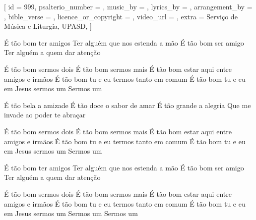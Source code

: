 [
    id                     = {999},
    psalterio_number       = {},
    music_by               = {},
    lyrics_by              = {},
    arrangement_by         = {},
    bible_verse            = {},
    licence_or_copyright   = {},
    video_url              = {},
    extra                  = {Serviço de Música e Liturgia, UPASD},
]


\beginverse
É tão bom ter amigos
Ter alguém que nos estenda a mão
É tão bom ser amigo
Ter alguém a quem dar atenção
\endverse


\beginchorus
É tão bom sermos dois
É tão bom sermos mais
É tão bom estar aqui entre amigos e irmãos
É tão bom tu e eu termos tanto em comum
É tão bom tu e eu em Jesus sermos um
Sermos um
\endchorus




\beginverse
É tão bela a amizade
É tão doce o sabor de amar
É tão grande a alegria
Que me invade ao poder te abraçar
\endverse


\beginchorus
É tão bom sermos dois
É tão bom sermos mais
É tão bom estar aqui entre amigos e irmãos
É tão bom tu e eu termos tanto em comum
É tão bom tu e eu em Jesus sermos um
Sermos um
\endchorus


\beginverse
É tão bom ter amigos
Ter alguém que nos estenda a mão
É tão bom ser amigo
Ter alguém a quem dar atenção
\endverse


\beginchorus
É tão bom sermos dois
É tão bom sermos mais
É tão bom estar aqui entre amigos e irmãos
É tão bom tu e eu termos tanto em comum
É tão bom tu e eu em Jesus sermos um
Sermos um
Sermos um
\endchorus
\endsong
